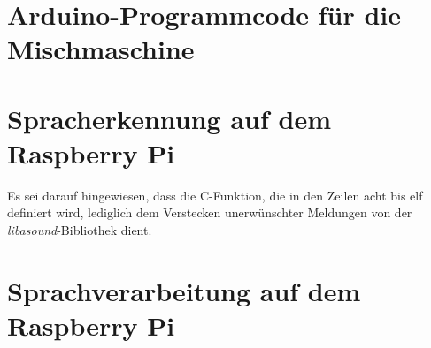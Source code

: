 \chapter{Arduino-Programmcode für die Mischmaschine}\label{Anhang_A}


\chapter{Spracherkennung auf dem Raspberry Pi}\label{Anhang_B}

Es sei darauf hingewiesen, dass die C-Funktion, die in den Zeilen acht bis elf definiert wird, lediglich dem Verstecken unerwünschter Meldungen von der \textit{libasound}-Bibliothek dient.

\chapter{Sprachverarbeitung auf dem Raspberry Pi}\label{Anhang_C}


